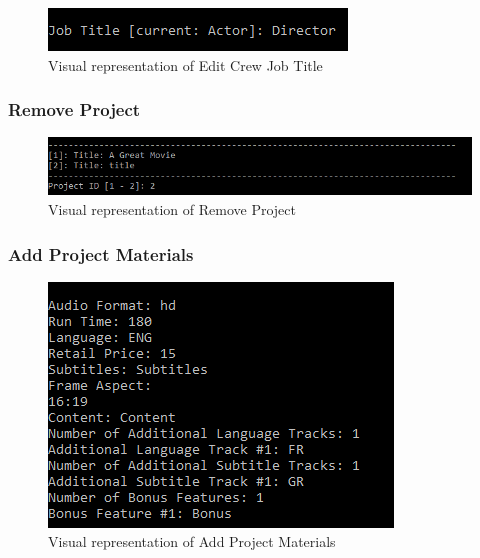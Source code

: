 \documentclass[
  english,
  a4paper,
,tablecaptionabove
]{scrartcl}
\begin{document}
\begin{figure}
\centering
\includegraphics{images/ui-screenshots/update-crew-job-title.png}
\caption{Visual representation of Edit Crew Job Title}
\end{figure}

\newpage

\hypertarget{remove-project}{%
\subsubsection{Remove Project}\label{remove-project}}

\begin{figure}
\centering
\includegraphics{images/ui-screenshots/remove-project.png}
\caption{Visual representation of Remove Project}
\end{figure}

\newpage

\hypertarget{add-project-materials}{%
\subsubsection{Add Project Materials}\label{add-project-materials}}

\begin{figure}
\centering
\includegraphics{images/ui-screenshots/add-project-materials.png}
\caption{Visual representation of Add Project Materials}
\end{figure}

\newpage
\end{document}
